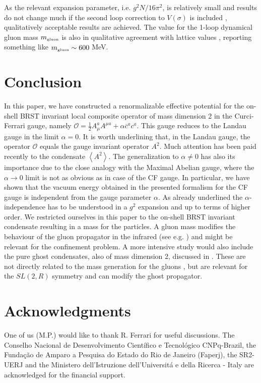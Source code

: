 \documentclass[a4paper,12pt]{article}
\newcommand{\text}{\textrm}
\newcommand{\sect}[1]{ \section{#1} \setcounter{equation}{0} }
\begin{document}
As the relevant expansion parameter, i.e. $g^{2}N/16\pi ^{2}$, is
relatively small and results do not change much if the second loop
correction to $V(\sigma )$ is included \cite{v1}, qualitatively
acceptable
results are achieved. The value for the 1-loop dynamical gluon mass $m_{%
\text{{\tiny {gluon}}}}$ is also in qualitative agreement with lattice
values \cite{Langfeld:2001cz,Alexandrou:2001fh}, reporting something like $%
m_{\text{{\tiny {gluon}}}}\sim 600$ MeV.

\sect{Conclusion}

\label{sec6} In this paper, we have constructed a renormalizable
effective potential for the on-shell BRST invariant local
composite operator of mass dimension 2 in the Curci-Ferrari gauge,
namely $\mathcal{O=}\frac{1}{2}A_{\mu }^{a}A^{\mu a}+\alpha
\overline{c}^{a}c^{a}$. This gauge reduces to the Landau gauge in
the limit $\alpha =0$. It is worth underlining that, in the Landau
gauge, the operator $\mathcal{O}$ equals the gauge invariant
operator $A^{2}$. Much attention has been paid recently to the
condensate $\left\langle A^{2}\right\rangle $. The generalization
to $\alpha \neq 0$ has also its importance due to the close
analogy with the Maximal Abelian gauge, where the $\alpha
\rightarrow 0$ limit is not as obvious as in case of the CF gauge.
In particular, we have shown that the vacuum energy obtained in
the presented formalism for the CF gauge is independent from the
gauge parameter $\alpha $. As already underlined the $\alpha
$-independence has to be understood in a $g^{2}$ expansion and up
to terms of higher order.\newline
\newline
We restricted ourselves in this paper to the on-shell BRST
invariant condensate resulting in a mass for the particles. A
gluon mass modifies the behaviour of the gluon propagator in the
infrared (see e.g. \cite{Langfeld:2001cz}) and might be relevant
for the confinement problem. A more intensive study would also
include the pure ghost condensates, also of mass dimension 2,
discussed in \cite
{Dudal:2002ye,Lemes:2002rc,Dudal:2002xe,Kondo:2000ey,Schaden:1999ew,Lemes:2002ey,Lemes:2002jv}.
These are not directly related to the mass generation for the
gluons \cite{Dudal:2002ye,Dudal:2002xe}, but are relevant for the
$SL(2,R)$ symmetry and can modify the ghost propagator.

\section*{Acknowledgments}
One of us (M.P.) would like to thank R. Ferrari for useful
discussions. The Conselho Nacional de Desenvolvimento
Cient\'{i}fico e Tecnol\'{o}gico CNPq-Brazil, the
Funda{\c{c}}{\~{a}}o de Amparo a Pesquisa do Estado do Rio de
Janeiro (Faperj), the SR2-UERJ and the Ministero dell'Istruzione
dell'Universit\'a e della Ricerca - Italy are acknowledged for the
financial support.
\end{document}
